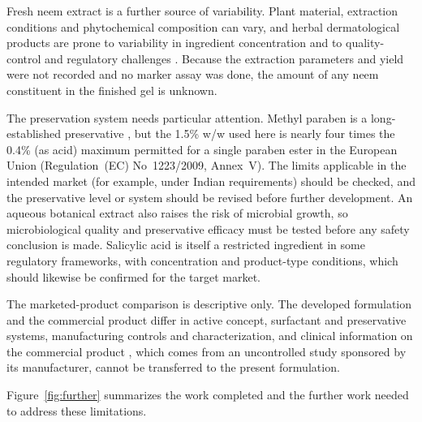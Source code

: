 \documentclass[10pt,a4paper,twocolumn]{article}
\begin{document}
Fresh neem extract is a further source of variability. Plant material,
extraction conditions and phytochemical composition can vary, and herbal
dermatological products are prone to variability in ingredient
concentration and to quality-control and regulatory challenges
\citep{brar2025}. Because the extraction parameters and yield were not
recorded and no marker assay was done, the amount of any neem constituent
in the finished gel is unknown.

The preservation system needs particular attention. Methyl paraben is a
long-established preservative \citep{soni2002}, but the 1.5\% w/w used
here is nearly four times the 0.4\% (as acid) maximum permitted for a
single paraben ester in the European Union (Regulation~(EC)
No~1223/2009, Annex~V). The limits applicable in the intended market (for
example, under Indian requirements) should be checked, and the
preservative level or system should be revised before further development.
An aqueous botanical extract also raises the risk of microbial growth, so
microbiological quality and preservative efficacy must be tested before
any safety conclusion is made. Salicylic acid is itself a restricted
ingredient in some regulatory frameworks, with concentration and
product-type conditions, which should likewise be confirmed for the target
market.

The marketed-product comparison is descriptive only. The developed
formulation and the commercial product differ in active concept,
surfactant and preservative systems, manufacturing controls and
characterization, and clinical information on the commercial product
\citep{yogesh2022}, which comes from an uncontrolled study sponsored by
its manufacturer, cannot be transferred to the present formulation.

% 
Figure~\ref{fig:further} summarizes the work completed and the further
work needed to address these limitations.
\end{document}
